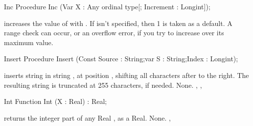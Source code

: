 \documentclass{report}
\begin{document}
\html{}
\begin{procedure}{Inc}
\Declaration
Procedure Inc (Var X : Any ordinal type[; Increment : Longint]);

\Description
{} increases the value of  with .
If  isn't specified, then 1 is taken as a default.
\Errors
A range check can occur, or an overflow error, if you try to increase 
over its maximum value.
\SeeAlso
{}
\end{procedure}
\html{}
\begin{procedure}{Insert}
\Declaration
Procedure Insert (Const Source : String;var S : String;Index : Longint);

\Description
{} inserts string  in string , at position
, shifting all characters after  to the right. The
resulting string is truncated at 255 characters, if needed.
\Errors
None.
\SeeAlso
{}, , 
\end{procedure}
\html{}
\begin{function}{Int}
\Declaration
Function Int (X : Real) : Real;

\Description
{} returns the integer part of any Real , as a Real.
\Errors
None.
\SeeAlso
{}, 
\end{function}
\html{}
\end{document}
